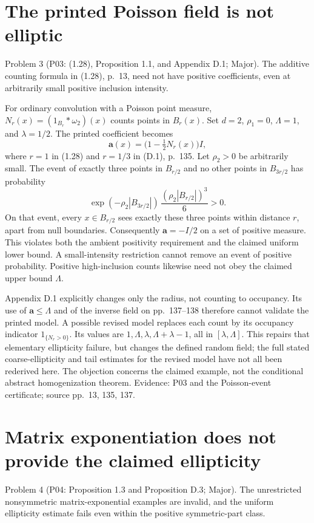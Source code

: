 \documentclass[10pt]{article}
\begin{document}
\section*{The printed Poisson field is not elliptic}
Problem 3 (P03: (1.28), Proposition 1.1, and Appendix D.1; Major).  The additive counting formula in (1.28), p. 13, need not have positive coefficients, even at arbitrarily small positive inclusion intensity.\par
For ordinary convolution with a Poisson point measure, \(N_r(x)=(1_{B_r}*\omega_2)(x)\) counts points in \(B_r(x)\). Set \(d=2\), \(\rho_1=0\), \(\Lambda=1\), and \(\lambda=1/2\). The printed coefficient becomes \[\mathbf a(x)=\bigl(1-\tfrac12N_r(x)\bigr)I,\] where \(r=1\) in (1.28) and \(r=1/3\) in (D.1), p. 135. Let \(\rho_2>0\) be arbitrarily small. The event of exactly three points in \(B_{r/2}\) and no other points in \(B_{3r/2}\) has probability \[\exp(-\rho_2|B_{3r/2}|)\,
 \frac{(\rho_2|B_{r/2}|)^3}{6}>0.\] On that event, every \(x\in B_{r/2}\) sees exactly these three points within distance \(r\), apart from null boundaries. Consequently \(\mathbf a=-I/2\) on a set of positive measure. This violates both the ambient positivity requirement and the claimed uniform lower bound. A small-intensity restriction cannot remove an event of positive probability. Positive high-inclusion counts likewise need not obey the claimed upper bound \(\Lambda\).\par
Appendix D.1 explicitly changes only the radius, not counting to occupancy. Its use of \(\mathbf a\le\Lambda\) and of the inverse field on pp. 137–138 therefore cannot validate the printed model. A possible revised model replaces each count by its occupancy indicator \(1_{\{N_r>0\}}\). Its values are \(1,\Lambda,\lambda,\Lambda+\lambda-1\), all in \([\lambda,\Lambda]\). This repairs that elementary ellipticity failure, but changes the defined random field; the full stated coarse-ellipticity and tail estimates for the revised model have not all been rederived here. The objection concerns the claimed example, not the conditional abstract homogenization theorem. Evidence: P03 and the Poisson-event certificate; source pp. 13, 135, 137.\par
\section*{Matrix exponentiation does not provide the claimed ellipticity}
Problem 4 (P04: Proposition 1.3 and Proposition D.3; Major).  The unrestricted nonsymmetric matrix-exponential examples are invalid, and the uniform ellipticity estimate fails even within the positive symmetric-part class.\par
\end{document}
